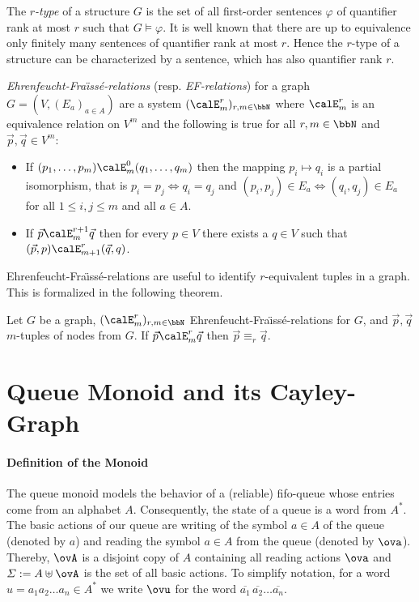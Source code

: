 \documentclass[a4paper,numberwithinsect,USenglish]{lipics-v2018}
\theoremstyle{plain}
\theoremstyle{remark}
\newcommand{\ov}[1]{\overline{#1}}
\renewcommand{\phi}{\varphi}
\begin{document}
	The \emph{$r$-type} of a structure $G$ is the set of all first-order sentences $\phi$ of quantifier rank at most $r$ such that $G\models \phi$. It is well known that there are up to equivalence only
	finitely many sentences of quantifier rank at most $r$. Hence the $r$-type of a structure can be characterized by a sentence, which has also quantifier rank $r$. 
	
	\emph{Ehrenfeucht-Fra\"\i{}ss\'e-relations} (resp. \emph{EF-relations}) for a graph $G = (V, (E_a)_{a\in A})$ are a system $(\calE^r_m)_{r,m\in\bbN}$ where  $\calE^r_m$ is an equivalence relation on $V^m$ and
	the following is true for all $r,m\in\bbN$ and $\vec{p},\vec{q} \in V^m$:
	\begin{itemize}
		\item If $(p_1,\ldots,p_m) \calE^0_m (q_1,\ldots,q_m)$ then the mapping $p_i \mapsto q_i$ is a partial isomorphism, that is $p_i= p_j \Leftrightarrow q_i=q_j$ and
		$(p_i,p_j)\in E_a \Leftrightarrow (q_i,q_j) \in E_a$ for all $1\leq i,j\leq m$ and all $a\in A$.
		\item If $\vec{p} \calE^{r+1}_m \vec{q}$ then for every $p\in V$ there exists a $q\in V$ such that $(\vec{p}, p) \calE^r_{m+1} (\vec{q}, q)$.
	\end{itemize}
	
	Ehrenfeucht-Fra\"\i{}ss\'e-relations are useful to identify $r$-equivalent tuples in a graph. This is formalized in the following theorem.
	\begin{theorem}
		Let $G$ be a graph, $(\calE^r_m)_{r,m\in\bbN}$ Ehrenfeucht-Fra\"\i{}ss\'e-relations for $G$, and $\vec{p}, \vec{q}$ $m$-tuples of nodes from $G$. If $\vec{p} \calE^r_m \vec{q}$ then 
		$\vec{p} \equiv_r \vec{q}$.
	\end{theorem}

\section{Queue Monoid and its Cayley-Graph}
\paragraph*{Definition of the Monoid}
The queue monoid models the behavior of a (reliable) fifo-queue whose entries come from an alphabet $A$. Consequently, the state of a queue is a word from $A^*$. The basic actions of our queue are writing of the symbol $a\in A$ of the queue (denoted by $a$) and reading the symbol $a\in A$ from the queue (denoted by $\ova$). Thereby, $\ovA$ is a disjoint copy of $A$ containing all reading actions $\ova$ and $\varSigma:=A\uplus\ovA$ is the set of all basic actions. To simplify notation, for a word $u=a_1a_2\dots a_n\in A^*$ we write $\ovu$ for the word $\ov{a_1}\,\ov{a_2}\dots \ov{a_n}$.
\end{document}
